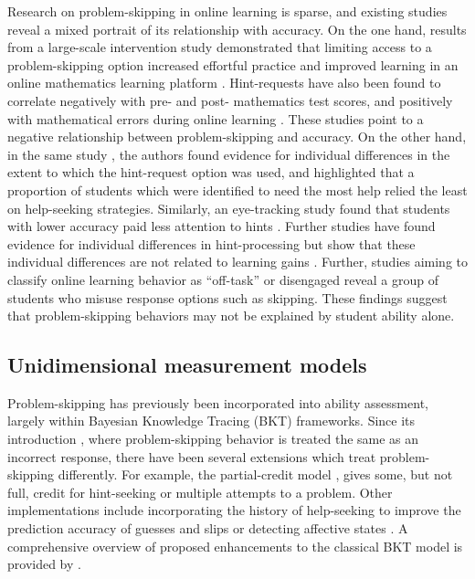 \documentclass[12pt]{article}
\begin{document}
Research on problem-skipping in online learning is sparse, and existing studies reveal a mixed portrait of its relationship with accuracy. On the one hand, results from a large-scale intervention study demonstrated that limiting access to a problem-skipping option increased effortful practice and improved learning in an online mathematics learning platform \parencite{savi2018delaying, savi2023combating}. Hint-requests have also been found to correlate negatively with pre- and post- mathematics test scores, and positively with mathematical errors during online learning \parencite{norum2024student}. These studies point to a negative relationship between problem-skipping and accuracy. On the other hand, in the same study \parencite{norum2024student}, the authors found evidence for individual differences in the extent to which the hint-request option was used, and highlighted that a proportion of students which were identified to need the most help relied the least on help-seeking strategies. Similarly, an eye-tracking study found that students with lower accuracy paid less attention to hints \parencite{conati2013understanding}. Further studies have found evidence for individual differences in hint-processing but show that these individual differences are not related to learning gains \parencite{goldin2012learner, goldin2013hints}. Further, studies aiming to classify online learning behavior as ``off-task'' or disengaged \parencite{baker2004off, baker2004detecting, baker2005performance, beck2004using} reveal a group of students who misuse response options such as skipping. These findings suggest that problem-skipping behaviors may not be explained by student ability alone. 

\subsection{Unidimensional measurement models}
Problem-skipping has previously been incorporated into ability assessment, largely within Bayesian Knowledge Tracing (BKT) frameworks. Since its introduction \parencite{corbett1995knowledge}, where problem-skipping behavior is treated the same as an incorrect response, there have been several extensions which treat problem-skipping differently. For example, the partial-credit model \parencite{wang2010representing, wang2013extending, ostrow2015improving}, gives some, but not full, credit for hint-seeking or multiple attempts to a problem. Other implementations include incorporating the history of help-seeking to improve the prediction accuracy of guesses and slips \parencite{baker2008more} or detecting affective states \parencite{corrigan2015dynamic}. A comprehensive overview of proposed enhancements to the classical BKT model is provided by \parencite{saric-grgic2024twenty-five}. 
\end{document}
